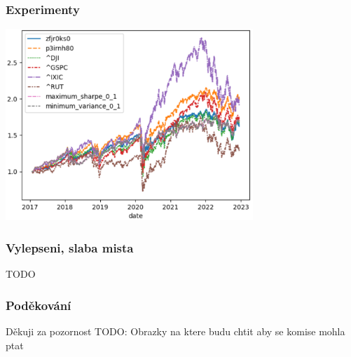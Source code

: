 \begin{frame}
    \frametitle{Experimenty}
    \begin{center}
        \centering
        \includegraphics[width=0.7\textwidth]{img/returns}
    \end{center}
\end{frame}

\begin{frame}
    \frametitle{Vylepseni, slaba mista}
    \begin{center}
        TODO
    \end{center}
\end{frame}




\begin{frame}
    \frametitle{Poděkování}
    {
        \Large
        Děkuji za pozornost
    }
    TODO: Obrazky na ktere budu chtit aby se komise mohla ptat
\end{frame}

